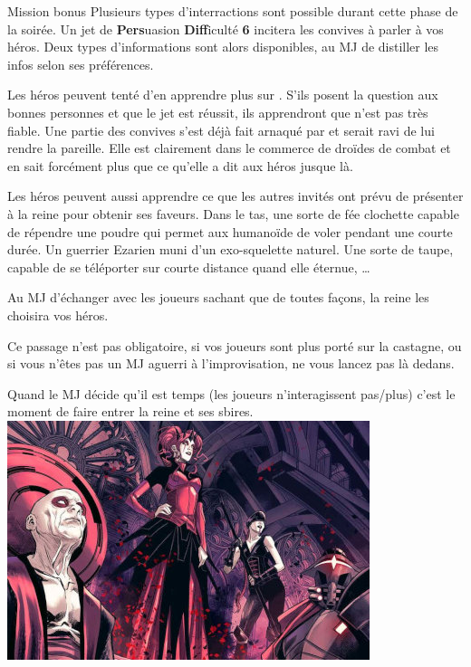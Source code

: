 \begin{paperbox}{Mission bonus}
Plusieurs types d’interractions sont possible durant cette phase de la soirée. Un jet de \textbf{Pers}uasion \textbf{Diff}iculté \textbf{6} incitera les convives à parler à vos héros. Deux types d’informations sont alors disponibles, au MJ de distiller les infos selon ses préférences.

Les héros peuvent tenté d’en apprendre plus sur . S’ils posent la question aux bonnes personnes et que le jet est réussit, ils apprendront que  n’est pas très fiable. Une partie des convives s’est déjà fait arnaqué par  et serait ravi de lui rendre la pareille. Elle est clairement dans le commerce de droïdes de combat et en sait forcément plus que ce qu’elle a dit aux héros jusque là.

Les héros peuvent aussi apprendre ce que les autres invités ont prévu de présenter à la reine pour obtenir ses faveurs. Dans le tas, une sorte de fée clochette capable de répendre une poudre qui permet aux humanoïde de voler pendant une courte durée. Un guerrier Ezarien muni d’un exo-squelette naturel. Une sorte de taupe, capable de se téléporter sur courte distance quand elle éternue, \dots

Au MJ d’échanger avec les joueurs sachant que de toutes façons, la reine les choisira vos héros. 

Ce passage n’est pas obligatoire, si vos joueurs sont plus porté sur la castagne, ou si vous n’êtes pas un MJ aguerri à l’improvisation, ne vous lancez pas là dedans.
\end{paperbox}

Quand le MJ décide qu’il est temps (les joueurs n’interagissent pas/plus) c’est le moment de faire entrer la reine et ses sbires.\\

\noindent\includegraphics[width=\linewidth]{_img/places/queen-with-minions.jpg}

